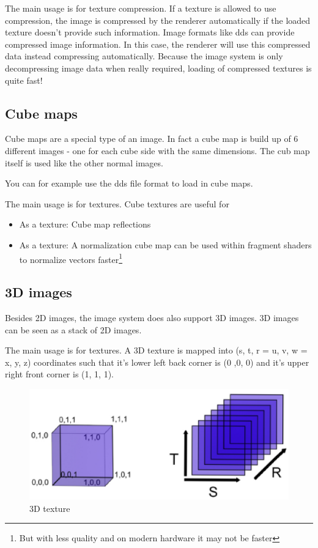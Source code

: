 The main usage is for texture compression. If a texture is allowed to use compression, the image is compressed by the renderer automatically if the loaded texture doesn't provide such information. Image formats like dds can provide compressed image information. In this case, the renderer will use this compressed data instead compressing automatically. Because the image system is only decompressing image data when really required, loading of compressed textures is quite fast!




\subsection{Cube maps}
Cube maps are a special type of an image. In fact a cube map is build up of 6 different images - one for each cube side with the same dimensions. The cub map itself is used like the other normal images.

You can for example use the dds file format to load in cube maps.

The main usage is for textures. Cube textures are useful for
\begin{itemize}
\item{As a texture: Cube map reflections}
\item{As a texture: A normalization cube map can be used within fragment shaders to normalize vectors faster\footnote{But with less quality and on modern hardware it may not be faster}}
\end{itemize}




\subsection{3D images}
Besides 2D images, the image system does also support 3D images. 3D images can be seen as a stack of 2D images.

The main usage is for textures. A 3D texture is mapped into (s, t, r = u, v, w = x, y, z) coordinates such that it's lower left back corner is (0 ,0, 0) and it's upper right front corner is (1, 1, 1).

\begin{figure}
  \begin{center}
    \includegraphics{pics/3DTex_1.eps}
  \end{center}
  \caption{3D texture}
  \label{fig:3D texture}
\end{figure}

